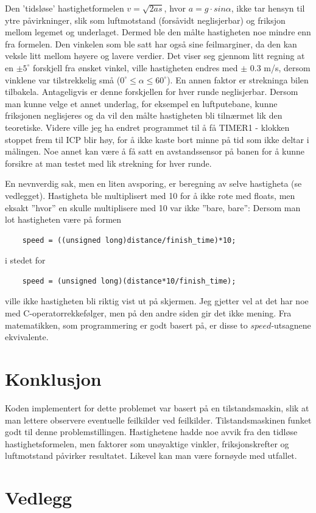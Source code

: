 \documentclass[11pt, a4paper]{report}
\begin{document}
Den 'tidsløse' hastighetformelen $v = \sqrt{2as}$, hvor $a = g\cdot sin\alpha$, ikke tar hensyn til ytre påvirkninger, slik som luftmotstand (forsåvidt neglisjerbar) og friksjon mellom legemet og underlaget. Dermed ble den målte hastigheten noe mindre enn fra formelen. Den vinkelen som ble satt har også sine feilmarginer, da den kan veksle litt mellom høyere og lavere verdier. Det viser seg gjennom litt regning at en $\pm 5^{\circ}$ forskjell fra ønsket vinkel, ville hastigheten endres med $\pm$ 0.3 m/s, dersom vinklene var tilstrekkelig små ($0^\circ \leq\alpha\leq 60^\circ$). En annen faktor er strekninga bilen tilbakela. Antageligvis er denne forskjellen for hver runde neglisjerbar.
\newline
Dersom man kunne velge et annet underlag, for eksempel en luftputebane, kunne friksjonen neglisjeres og da vil den målte hastigheten bli tilnærmet lik den teoretiske. Videre ville jeg ha endret programmet til å få TIMER1 - klokken stoppet frem til ICP blir høy, for å ikke kaste bort minne på tid som ikke deltar i målingen. Noe annet kan være å få satt en avstandssensor på banen for å kunne forsikre at man testet med lik strekning for hver runde. 
\newline

En nevnverdig sak, men en liten avsporing, er beregning av selve hastigheta (se vedlegget). Hastigheta ble multiplisert med 10 for å ikke rote med floats, men eksakt ''hvor'' en skulle multiplisere med 10 var ikke ''bare, bare'': Dersom man lot hastigheten være på formen
\begin{lstlisting}
	speed = ((unsigned long)distance/finish_time)*10;
\end{lstlisting}
i stedet for
\begin{lstlisting}
	speed = (unsigned long)(distance*10/finish_time);
\end{lstlisting}
ville ikke hastigheten bli riktig vist ut på skjermen. Jeg gjetter vel at det har noe med C-operatorrekkefølger, men på den andre siden gir det ikke mening. Fra matematikken, som programmering er godt basert på, er disse to $speed$-utsagnene ekvivalente. 


\section{Konklusjon}
Koden implementert for dette problemet var basert på en tilstandsmaskin, slik at man lettere observere eventuelle feilkilder ved feilkilder. Tilstandsmaskinen funket godt til denne problemstillingen. Hastighetene hadde noe avvik fra den tidløse hastighetsformelen, men faktorer som unøyaktige vinkler, friksjonskrefter og luftmotstand påvirker resultatet. Likevel kan man være fornøyde med utfallet. 

\newpage
\section{Vedlegg}


\end{document}
